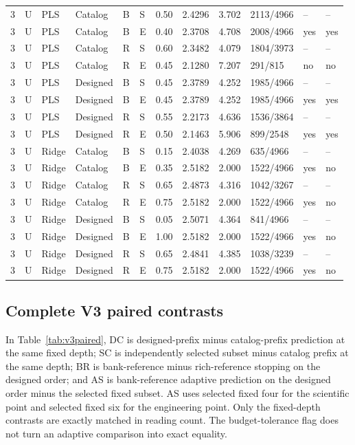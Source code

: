 \documentclass[10pt,a4paper]{article}
\begin{document}
\begin{landscape}
\begin{longtable}{rlllllrrrlll}
3 & U & PLS & Catalog & B & S & 0.50 & 2.4296 & 3.702 & 2113/4966 & -- & -- \\
3 & U & PLS & Catalog & B & E & 0.40 & 2.3708 & 4.708 & 2008/4966 & yes & yes \\
3 & U & PLS & Catalog & R & S & 0.60 & 2.3482 & 4.079 & 1804/3973 & -- & -- \\
3 & U & PLS & Catalog & R & E & 0.45 & 2.1280 & 7.207 & 291/815 & no & no \\
3 & U & PLS & Designed & B & S & 0.45 & 2.3789 & 4.252 & 1985/4966 & -- & -- \\
3 & U & PLS & Designed & B & E & 0.45 & 2.3789 & 4.252 & 1985/4966 & yes & yes \\
3 & U & PLS & Designed & R & S & 0.55 & 2.2173 & 4.636 & 1536/3864 & -- & -- \\
3 & U & PLS & Designed & R & E & 0.50 & 2.1463 & 5.906 & 899/2548 & yes & yes \\
3 & U & Ridge & Catalog & B & S & 0.15 & 2.4038 & 4.269 & 635/4966 & -- & -- \\
3 & U & Ridge & Catalog & B & E & 0.35 & 2.5182 & 2.000 & 1522/4966 & yes & no \\
3 & U & Ridge & Catalog & R & S & 0.65 & 2.4873 & 4.316 & 1042/3267 & -- & -- \\
3 & U & Ridge & Catalog & R & E & 0.75 & 2.5182 & 2.000 & 1522/4966 & yes & no \\
3 & U & Ridge & Designed & B & S & 0.05 & 2.5071 & 4.364 & 841/4966 & -- & -- \\
3 & U & Ridge & Designed & B & E & 1.00 & 2.5182 & 2.000 & 1522/4966 & yes & no \\
3 & U & Ridge & Designed & R & S & 0.65 & 2.4841 & 4.385 & 1038/3239 & -- & -- \\
3 & U & Ridge & Designed & R & E & 0.75 & 2.5182 & 2.000 & 1522/4966 & yes & no \\
\end{longtable}
\endgroup
\end{landscape}

\subsection{Complete V3 paired contrasts}
In Table~\ref{tab:v3paired}, DC is designed-prefix minus catalog-prefix prediction at the same fixed depth; SC is independently selected subset minus catalog prefix at the same depth; BR is bank-reference minus rich-reference stopping on the designed order; and AS is bank-reference adaptive prediction on the designed order minus the selected fixed subset. AS uses selected fixed four for the scientific point and selected fixed six for the engineering point. Only the fixed-depth contrasts are exactly matched in reading count. The budget-tolerance flag does not turn an adaptive comparison into exact equality.
\end{document}
